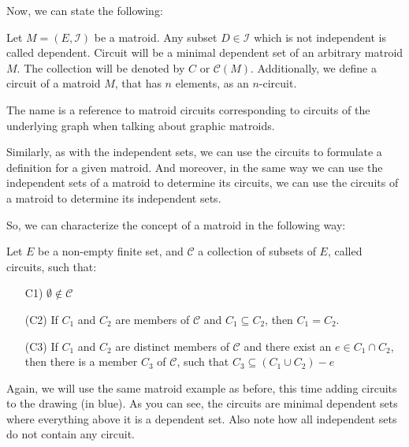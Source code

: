 Now, we can state the following:
\begin{defn}
Let $M = (E, \mathcal{I})$ be a matroid. Any subset $D \in \mathcal{I}$ which is not independent is called dependent. Circuit will be a minimal dependent set of an arbitrary matroid $M$. The collection will be denoted by $C$ or $\mathcal{C}(M)$. Additionally, we define a circuit of a matroid $M$, that has $n$ elements, as an $n$-circuit.
\end{defn}

The name is a reference to matroid circuits corresponding to circuits of the underlying graph when talking about graphic matroids.

Similarly, as with the independent sets, we can use the circuits to formulate a definition for a given matroid. And moreover, in the same way we can use the independent sets of a matroid to determine its circuits, we can use the circuits of a matroid to determine its independent sets.

So, we can characterize the concept of a matroid in the following way:

\begin{defn}
    Let $E$ be a non-empty finite set, and $\mathcal{C}$ a collection of subsets of $E$, called circuits, such that:

    \begin{enumerate}
        \item[C1)] $\emptyset \notin \mathcal{C}$

        \item[(C2)] If $C_1$ and $C_2$ are members of $\mathcal{C}$ and $C_1 \subseteq C_2$, then $C_1 = C_2$.

        \item[(C3)] If $C_1$ and $C_2$ are distinct members of $\mathcal{C}$ and there exist an $e \in C_1 \cap C_2$, then there is a member $C_3$ of $\mathcal{C}$, such that $C_3 \subseteq (C_1  \cup C_2) - e$
    \end{enumerate}
    
\end{defn}

Again, we will use the same matroid example as before, this time adding circuits to the drawing (in blue). As you can see, the circuits are minimal dependent sets where everything above it is a dependent set. Also note how all independent sets do not contain any circuit.

